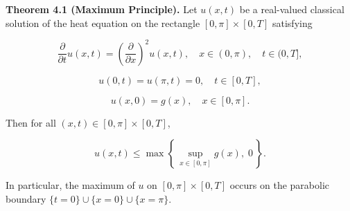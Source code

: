 \textbf{Theorem 4.1 (Maximum Principle).} Let $u(x,t)$ be a real-valued classical solution of the heat equation on the rectangle $[0,\pi] \times [0,T]$ satisfying

$$\frac{\partial}{\partial t} u(x, t) = \left( \frac{\partial}{\partial x} \right)^2 u(x, t), \quad x \in (0, \pi), \quad t \in (0, T],$$

$$u(0, t) = u(\pi, t) = 0, \quad t \in [0, T],$$

$$u(x, 0) = g(x), \quad x \in [0, \pi].$$

Then for all $(x, t) \in [0, \pi] \times [0, T]$,

$$u(x, t) \leq \max \left\{ \, \sup_{x \in [0,\pi]} g(x), \; 0 \, \right\}.$$

In particular, the maximum of $u$ on $[0,\pi] \times [0,T]$ occurs on the parabolic boundary $\{ t = 0 \} \cup \{ x = 0 \} \cup \{ x = \pi \}$.

